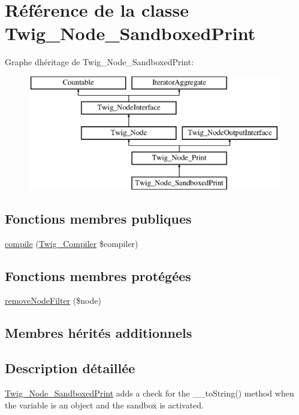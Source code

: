 \hypertarget{class_twig___node___sandboxed_print}{}\section{Référence de la classe Twig\+\_\+\+Node\+\_\+\+Sandboxed\+Print}
\label{class_twig___node___sandboxed_print}
Graphe d\textquotesingle{}héritage de Twig\+\_\+\+Node\+\_\+\+Sandboxed\+Print\+:\begin{figure}[H]
\begin{center}
\leavevmode
\includegraphics[height=5.000000cm]{class_twig___node___sandboxed_print}
\end{center}
\end{figure}
\subsection*{Fonctions membres publiques}
\begin{DoxyCompactItemize}
\item 
\hyperlink{class_twig___node___sandboxed_print_a4e0faa87c3fae583620b84d3607085da}{compile} (\hyperlink{class_twig___compiler}{Twig\+\_\+\+Compiler} \$compiler)
\end{DoxyCompactItemize}
\subsection*{Fonctions membres protégées}
\begin{DoxyCompactItemize}
\item 
\hyperlink{class_twig___node___sandboxed_print_ae761088e1a4d87e5ddfc47b0376c340d}{remove\+Node\+Filter} (\$node)
\end{DoxyCompactItemize}
\subsection*{Membres hérités additionnels}


\subsection{Description détaillée}
\hyperlink{class_twig___node___sandboxed_print}{Twig\+\_\+\+Node\+\_\+\+Sandboxed\+Print} adds a check for the \+\_\+\+\_\+to\+String() method when the variable is an object and the sandbox is activated.


